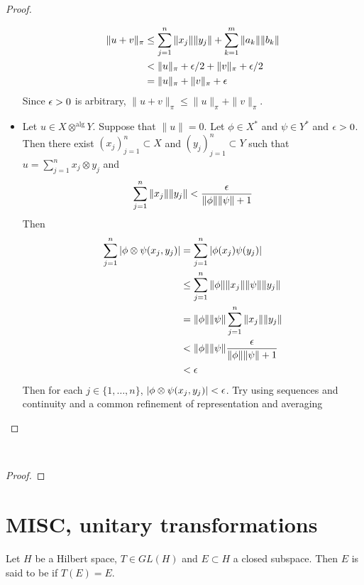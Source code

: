 \documentclass{book}
\begin{document}
\begin{proof}
\begin{itemize}
	\begin{align*}
	\|u + v\|_{\pi} 
	& \leq \sum\limits_{j=1}^n \|x_j\| \|y_j\| + \sum\limits_{k=1}^m \|a_k\| \|b_k\| \\
	&< \|u\|_{\pi} + \epsilon/2 + \|v\|_{\pi} + \epsilon/2 \\
	&= \|u\|_{\pi} + \|v\|_{\pi} + \epsilon
	\end{align*}
	Since $\epsilon >0$ is arbitrary, $\|u + v\|_{\pi} \leq \|u\|_{\pi} + \|v\|_{\pi}$.
	\item Let $u \in X \otimes^{\text{alg}} Y$. Suppose that $\|u\| = 0$. Let $\phi \in X^*$ and $\psi \in Y^*$ and $\epsilon >0$. Then there exist $(x_j)_{j=1}^n \subset X$ and $(y_j)_{j=1}^n \subset Y$ such that $u = \sum\limits_{j=1}^n x_j \otimes y_j $ and $$\sum\limits_{j=1}^n \|x_j\| \|y_j\| < \frac{\epsilon}{\|\phi\| \|\psi\| + 1}$$
	Then 
	\begin{align*}
	\sum_{j=1}^n |\phi \otimes \psi(x_j,y_j)|
	&=  \sum_{j=1}^n |\phi(x_j)\psi(y_j)| \\
	& \leq  \sum_{j=1}^n \|\phi\|\|x_j\| \|\psi\|\|y_j\| \\
	&= \|\phi\|\|\psi\|\sum_{j=1}^n \|x_j\| \|y_j\| \\
	& < \|\phi\|\|\psi\|\frac{\epsilon}{\|\phi\| \|\psi\| + 1} \\
	& < \epsilon
	\end{align*}
	Then for each $j \in \{1, \ldots, n\}$, $|\phi \otimes \psi(x_j,y_j)| < \epsilon$.
	 Try using sequences and continuity and a common refinement of representation and averaging
	\end{itemize}
	\end{proof}
	
	\begin{ex}  \\
	
	\end{ex}
	
	\begin{proof}
	
	\end{proof}	
	
	
	
	
	\section{MISC, unitary transformations}
	
	\begin{defn}
		Let $H$ be a Hilbert space, $T \in GL(H)$ and $E \subset H$ a closed subspace. Then $E$ is said to be  if $T(E) = E$.  
	\end{defn}
	
\end{document}
